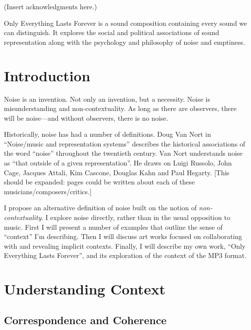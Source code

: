 \documentclass{thesis}
\author{Kyle McDonald}
\begin{document}
 
\titlepage
\tableofcontents


(Insert acknowledgments here.)


Only Everything Lasts Forever is a sound composition containing every sound we can distinguish. It explores the social and political associations of sound representation along with the psychology and philosophy of noise and emptiness.

\chapter{Introduction}

Noise is an invention. Not only an invention, but a necessity. Noise is misunderstanding and non-contextuality. As long as there are observers, there will be noise---and without observers, there is no noise.

Historically, noise has had a number of definitions. Doug Van Nort in ``Noise/music and representation systems''\cite{Vannort06} describes the historical associations of the word ``noise'' throughout the twentieth century. Van Nort understands noise as ``that outside of a given representation''. He draws on Luigi Russolo\cite{Russolo04}, John Cage\cite{Cage61}, Jacques Attali\cite{Attali85}, Kim Cascone\cite{Cascone00}, Douglas Kahn\cite{Kahn01} and Paul Hegarty\cite{Hegarty02}. [This should be expanded: pages could be written about each of these musicians/composers/critics.]

I propose an alternative definition of noise built on the notion of \emph{non-contextuality}. I explore noise directly, rather than in the usual opposition to music. First I will present a number of examples that outline the sense of ``context'' I'm describing. Then I will discuss art works focused on collaborating with and revealing implicit contexts. Finally, I will describe my own work, ``Only Everything Lasts Forever'', and its exploration of the context of the MP3 format.

\chapter{Understanding Context}

\section{Correspondence and Coherence}
\end{document}
